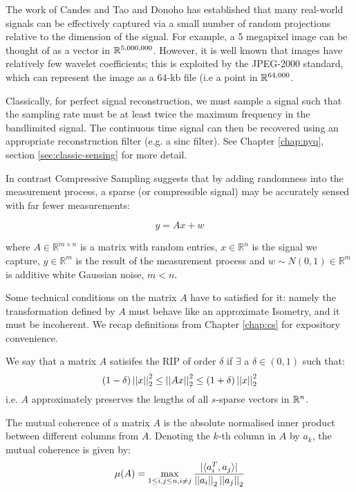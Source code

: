 The work of Candes and Tao \cite{Candes2006} and Donoho \cite{Donoho2006} has established that many real-world signals can be effectively captured via a small number of random projections relative to the dimension of the signal. For example, a 5 megapixel image can be thought of as a vector in \({\mathbb{R}}^{5,000,000}\). However, it is well known that images have relatively few wavelet coefficients; this is exploited by the JPEG-2000 standard, which can represent the image as a 64-kb file (i.e a point in \({\mathbb{R}}^{64,000}\).

Classically, for perfect signal reconstruction, we must sample a signal such that the sampling rate must be at least twice the maximum frequency in the bandlimited signal. The continuous time signal can then be recovered using an appropriate reconstruction filter (e.g. a sinc filter). See Chapter \ref{chap:nyq}, section \ref{sec:classic-sensing} for more detail.

In contrast Compressive Sampling suggests that by adding randomness into the measurement process, a sparse (or compressible signal) may be accurately sensed with far fewer measurements:

\begin{equation}
y = Ax + w
\end{equation}


where \(A \in \mathbb{R}^{m \times n}\) is a matrix with random entries, \(x \in \mathbb{R}^n\) is the signal we capture, \(y \in \mathbb{R}^m\) is the result of the measurement process and \(w \sim N\left(0,1\right) \in \mathbb{R}^m\) is additive white Gaussian noise, \(m < n\).

Some technical conditions on the matrix \(A\) have to satisfied for it: namely the transformation defined by \(A\) must behave like an approximate Isometry, and it must be incoherent. We recap definitions from Chapter \ref{chap:cs} for expository convenience.

\begin{definition}[RIP]
We say that a matrix \(A\) satisifes the RIP of order \(\delta\) if \(\exists\) a \(\delta \in \left(0, 1\right)\) such that:
\begin{equation}
\left(1 - \delta\right) \left|\left|x\right|\right|_2^2 \leq \left|\left|Ax\right|\right|_2^2 \leq \left(1 + \delta\right) \left|\left|x\right|\right|_2^2
\end{equation}
i.e. \(A\) approximately preserves the lengths of all \(s\)-sparse vectors in \({\mathbb{R}}^n\). 
\end{definition}

\begin{definition}[Coherence]
The mutual coherence of a matrix \(A\) is the absolute normalised inner product between different columns from \(A\). Denoting the \(k\)-th column in \(A\) by \(a_k\), the mutual coherence is given by:
\begin{equation}
\mu(A) = \max_{1\leq i,j\leq n , i\neq j} \frac{|\langle a^T_i, a_j\rangle|}{\left|\left|a_i\right|\right|_2\left|\left|a_j\right|\right|_2}
\end{equation}
\end{definition}

